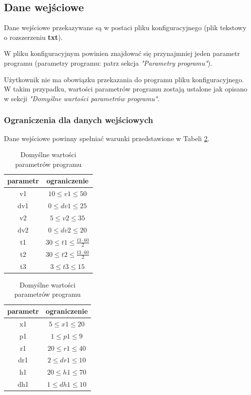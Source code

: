 \documentclass[a4paper]{article}
\begin{document}
\subsection{Dane wej\'sciowe}
\quad Dane wej\'sciowe przekazywane s\k{a} w postaci pliku konfiguracyjnego (plik tekstowy o rozszerzeniu \textbf{txt}). 


W pliku konfiguracyjnym powinien znajdowa\'c si\k{e} przynajmniej jeden parametr programu (parametry programu: patrz sekcja \textit{"Parametry programu"}).  


U\.zytkownik nie ma obowi\k{a}zku przekazania do programu pliku konfiguracyjnego. W takim przypadku, warto\'sci parametr\'ow programu zostaj\k{a} ustalone jak opisano w sekcji \textit{"Domy\'slne warto\'sci parametr\'ow programu"}.

\subsubsection{Ograniczenia dla danych wej\'sciowych}
\quad Dane wej\'sciowe powinny spe\l{}nia\'c warunki przedstawione w Tabeli \ref{table:ograniczenia}.
\begin{table}[ht]
\centering
    \renewcommand{\arraystretch}{1.5}
    \begin{tabular}{|c|c|}
    \rowcolor{lightgray}
        \hline
        parametr&ograniczenie \\
        \hline
        v1& \(10 \leqslant v1 \leqslant 50\)\\
        \hline
        dv1& \(0 \leqslant dv1 \leqslant 25\)\\
        \hline
        v2& \(5 \leqslant v2 \leqslant 35\)\\
        \hline
        dv2& \(0 \leqslant dv2 \leqslant 20\)\\
        \hline
        t1& \(30 \leqslant t1 \leqslant  \frac{t3 \cdot 60}{2} \)\\
        \hline
        t2& \(30 \leqslant t2 \leqslant \frac{t3 \cdot 60}{2}\)\\
        \hline
        t3& \(3 \leqslant t3 \leqslant 15\)\\
        \hline
\end{tabular}
\quad
    \begin{tabular}{|c|c|}
    \rowcolor{lightgray}
        \hline 
        parametr&ograniczenie \\
        \hline
        x1& \(5 \leqslant x1 \leqslant 20\)\\ 
        \hline
        p1& \(1 \leqslant p1 \leqslant 9\)\\
        \hline
        r1& \(20 \leqslant r1 \leqslant 40\)\\
        \hline
        dr1& \(2 \leqslant dr1 \leqslant 10\)\\
        \hline
        h1& \(20 \leqslant h1 \leqslant 70\)\\
        \hline
        dh1& \(1 \leqslant dh1 \leqslant 10\)\\
        \hline
\end{tabular}
\color{lightgray}\caption{Domy\'slne warto\'sci parametr\'ow programu}
\label{table:ograniczenia}
\end{table}
\end{document}
